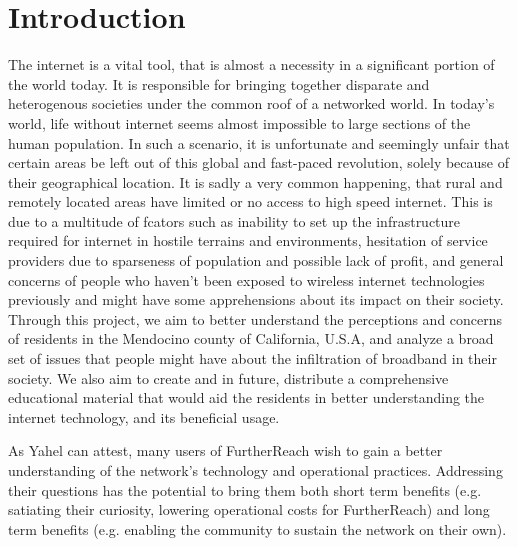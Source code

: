\section{Introduction}
\label{sec:introduction}

The internet is a vital tool, that is almost a necessity in a significant portion of the world today. It is responsible for bringing together disparate and heterogenous societies under the common roof of a networked world. In today's world, life without internet seems almost impossible to large sections of the human population. In such a scenario, it is unfortunate and seemingly unfair that certain areas be left out of this global and fast-paced revolution, solely because of their geographical location. It is sadly a very common happening, that rural and remotely located areas have limited or no access to high speed internet. This is due to a multitude of fcators such as inability to set up the infrastructure required for internet in hostile terrains and environments, hesitation of service providers due to sparseness of population and possible lack of profit, and general concerns of people who haven't been exposed to wireless internet technologies previously and might have some apprehensions about its impact on their society. Through this project, we aim to better understand the perceptions and concerns of residents in the Mendocino county of California, U.S.A, and analyze a broad set of issues that people might have about the infiltration of broadband in their society. We also aim to create and in future, distribute a comprehensive educational material that would aid the residents in better understanding the internet technology, and its beneficial usage.

As Yahel can attest, many users of FurtherReach wish to gain a better
understanding of the network’s technology and operational practices. Addressing
their questions has the potential to bring them both short term benefits
(e.g. satiating their curiosity, lowering operational costs for FurtherReach)
and long term benefits (e.g. enabling the community to sustain the network on
their own).


